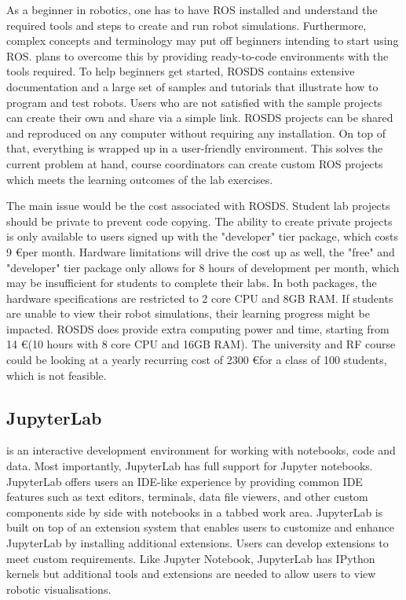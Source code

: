 \documentclass{l4proj}
\begin{document}
As a beginner in robotics, one has to have ROS installed and understand the required tools and steps to create and run robot simulations. Furthermore, complex concepts and terminology may put off beginners intending to start using ROS. \cite{ROSDS} plans to overcome this by providing ready-to-code environments with the tools required. To help beginners get started, ROSDS contains extensive documentation and a large set of samples and tutorials that illustrate how to program and test robots. Users who are not satisfied with the sample projects can create their own and share via a simple link. ROSDS projects can be shared and reproduced on any computer without requiring any installation. On top of that, everything is wrapped up in a user-friendly environment. This solves the current problem at hand, course coordinators can create custom ROS projects which meets the learning outcomes of the lab exercises.

The main issue would be the cost associated with ROSDS. Student lab projects should be private to prevent code copying. The ability to create private projects is only available to users signed up with the "developer" tier package, which costs 9 \euro per month. Hardware limitations will drive the cost up as well, the "free" and "developer" tier package only allows for 8 hours of development per month, which may be insufficient for students to complete their labs. In both packages, the hardware specifications are restricted to 2 core CPU and 8GB RAM. If students are unable to view their robot simulations, their learning progress might be impacted. ROSDS does provide extra computing power and time, starting from 14 \euro (10 hours with 8 core CPU and 16GB RAM). The university and RF course could be looking at a yearly recurring cost of 2300 \euro for a class of 100 students, which is not feasible.

\subsection{JupyterLab}

\cite{JupyterLab} is an interactive development environment for working with notebooks, code and data. Most importantly, JupyterLab has full support for Jupyter notebooks. JupyterLab offers users an IDE-like experience by providing common IDE features such as text editors, terminals, data file viewers, and other custom components side by side with notebooks in a tabbed work area. JupyterLab is built on top of an extension system that enables users to customize and enhance JupyterLab by installing additional extensions. Users can develop extensions to meet custom requirements. Like Jupyter Notebook, JupyterLab has IPython kernels but additional tools and extensions are needed to allow users to view robotic visualisations. 
\end{document}
